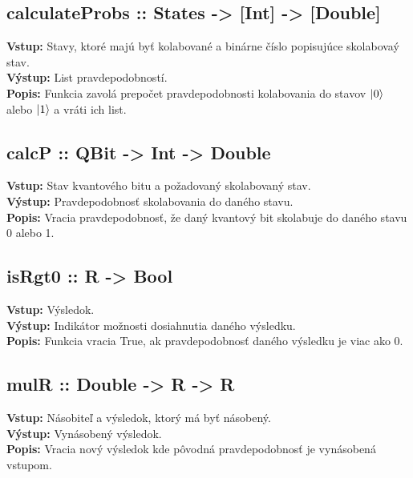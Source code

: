 \subsection*{calculateProbs :: States -> [Int] -> [Double]}
\textbf{Vstup:} Stavy, ktoré majú byť kolabované a binárne číslo popisujúce
skolabovaý stav.\\
\textbf{Výstup:} List pravdepodobností.\\
\textbf{Popis:} Funkcia zavolá prepočet pravdepodobnosti kolabovania do stavov
\(\ket{0}\) alebo \(\ket{1}\) a vráti ich list.

\subsection*{calcP :: QBit -> Int -> Double}
\textbf{Vstup:} Stav kvantového bitu a požadovaný skolabovaný stav.\\
\textbf{Výstup:} Pravdepodobnosť skolabovania do daného stavu.\\
\textbf{Popis:} Vracia pravdepodobnosť, že daný kvantový bit skolabuje do 
daného stavu 0 alebo 1.

\subsection*{isRgt0 :: R -> Bool}
\textbf{Vstup:} Výsledok.\\
\textbf{Výstup:} Indikátor možnosti dosiahnutia daného výsledku.\\
\textbf{Popis:} Funkcia vracia True, ak pravdepodobnosť daného výsledku je 
viac ako 0.

\subsection*{mulR :: Double -> R -> R}
\textbf{Vstup:} Násobiteľ a výsledok, ktorý má byť násobený.\\
\textbf{Výstup:} Vynásobený výsledok.\\
\textbf{Popis:} Vracia nový výsledok kde pôvodná pravdepodobnosť je vynásobená
vstupom.
